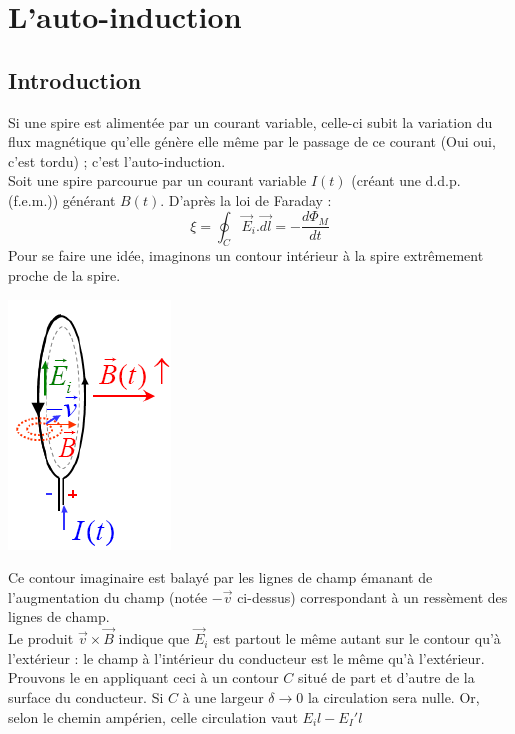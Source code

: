 \documentclass	[11pt, a4paper, openany]{book}
\begin{document}
\section{L'auto-induction}
\subsection{Introduction}
Si  une spire est alimentée par un courant variable, celle-ci subit la variation du flux magnétique qu'elle génère elle même par le passage de ce courant (Oui oui, c'est tordu) ; c'est l'auto-induction.\\

Soit une spire parcourue par un courant variable $I(t)$ (créant une d.d.p. (f.e.m.)) générant $B(t)$. D'après la loi de Faraday : 
\begin{equation}
\xi = \oint_C \vec{E}_i.\vec{dl} = -\frac{d\Phi_M}{dt}
\end{equation}
Pour se faire une idée, imaginons un contour intérieur à la spire extrêmement proche de la spire.

\begin{center}
\includegraphics[scale=0.55]{em/image20.png}\\
\end{center}

Ce contour imaginaire est balayé par les lignes de champ émanant de l'augmentation du champ (notée $-\vec{v}$ ci-dessus) correspondant à un ressèment des lignes de champ.\\
Le produit $\vec{v} \times \vec{B}$ indique que $\vec{E}_i$ est partout le même autant sur le contour qu'à l'extérieur : le champ à l'intérieur du conducteur est le même qu'à l'extérieur.\\
Prouvons le en appliquant ceci à un contour $C$ situé de part et d'autre de la surface du conducteur. Si $C$ à une largeur $\delta \rightarrow 0$ la circulation sera nulle. Or, selon le chemin ampérien, celle circulation vaut $E_il - E_I'l$
\end{document}
